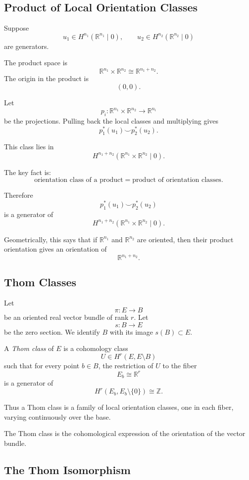 \documentclass[12pt,a4paper]{article}
\theoremstyle{notespace}
\begin{document}
\subsection{Product of Local Orientation Classes}

Suppose
\[
u_1\in H^{n_1}(\mathbb R^{n_1}\mid 0),
\qquad
u_2\in H^{n_2}(\mathbb R^{n_2}\mid 0)
\]
are generators.

The product space is
\[
\mathbb R^{n_1}\times \mathbb R^{n_2}
\cong
\mathbb R^{n_1+n_2}.
\]
The origin in the product is
\[
(0,0).
\]

Let
\[
p_i:\mathbb R^{n_1}\times \mathbb R^{n_2}\to \mathbb R^{n_i}
\]
be the projections. Pulling back the local classes and multiplying gives
\[
p_1^*(u_1)\smile p_2^*(u_2).
\]

This class lies in
\[
H^{n_1+n_2}(\mathbb R^{n_1}\times \mathbb R^{n_2}\mid 0).
\]

The key fact is:
\[
\text{orientation class of a product}
=
\text{product of orientation classes}.
\]

Therefore
\[
p_1^*(u_1)\smile p_2^*(u_2)
\]
is a generator of
\[
H^{n_1+n_2}(\mathbb R^{n_1}\times \mathbb R^{n_2}\mid 0).
\]

Geometrically, this says that if \(\mathbb R^{n_1}\) and \(\mathbb R^{n_2}\) are
oriented, then their product orientation gives an orientation of
\[
\mathbb R^{n_1+n_2}.
\]

\subsection{Thom Classes}

Let
\[
\pi:E\to B
\]
be an oriented real vector bundle of rank \(r\). Let
\[
s:B\to E
\]
be the zero section. We identify \(B\) with its image \(s(B)\subset E\).

A \emph{Thom class} of \(E\) is a cohomology class
\[
U\in H^r(E,E\setminus B)
\]
such that for every point \(b\in B\), the restriction of \(U\) to the fiber
\[
E_b\cong \mathbb R^r
\]
is a generator of
\[
H^r(E_b,E_b\setminus\{0\})
\cong \mathbb Z.
\]

Thus a Thom class is a family of local orientation classes, one in each fiber,
varying continuously over the base.

The Thom class is the cohomological expression of the orientation of the vector
bundle.

\subsection{The Thom Isomorphism}
\end{document}
